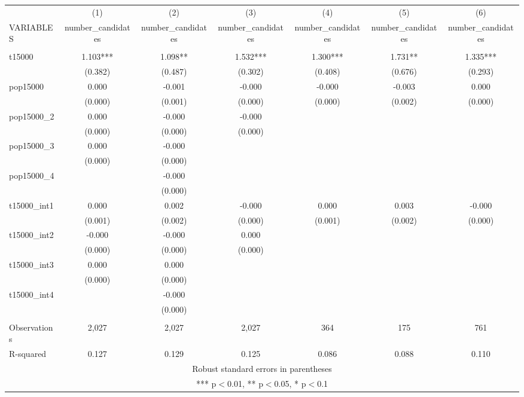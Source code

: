 \documentclass[]{article}
\begin{document}
\begin{tabular}{lcccccc} \hline
 & (1) & (2) & (3) & (4) & (5) & (6) \\
VARIABLES & number\_candidates & number\_candidates & number\_candidates & number\_candidates & number\_candidates & number\_candidates \\ \hline
 &  &  &  &  &  &  \\
t15000 & 1.103*** & 1.098** & 1.532*** & 1.300*** & 1.731** & 1.335*** \\
 & (0.382) & (0.487) & (0.302) & (0.408) & (0.676) & (0.293) \\
pop15000 & 0.000 & -0.001 & -0.000 & -0.000 & -0.003 & 0.000 \\
 & (0.000) & (0.001) & (0.000) & (0.000) & (0.002) & (0.000) \\
pop15000\_2 & 0.000 & -0.000 & -0.000 &  &  &  \\
 & (0.000) & (0.000) & (0.000) &  &  &  \\
pop15000\_3 & 0.000 & -0.000 &  &  &  &  \\
 & (0.000) & (0.000) &  &  &  &  \\
pop15000\_4 &  & -0.000 &  &  &  &  \\
 &  & (0.000) &  &  &  &  \\
t15000\_int1 & 0.000 & 0.002 & -0.000 & 0.000 & 0.003 & -0.000 \\
 & (0.001) & (0.002) & (0.000) & (0.001) & (0.002) & (0.000) \\
t15000\_int2 & -0.000 & -0.000 & 0.000 &  &  &  \\
 & (0.000) & (0.000) & (0.000) &  &  &  \\
t15000\_int3 & 0.000 & 0.000 &  &  &  &  \\
 & (0.000) & (0.000) &  &  &  &  \\
t15000\_int4 &  & -0.000 &  &  &  &  \\
 &  & (0.000) &  &  &  &  \\
 &  &  &  &  &  &  \\
Observations & 2,027 & 2,027 & 2,027 & 364 & 175 & 761 \\
 R-squared & 0.127 & 0.129 & 0.125 & 0.086 & 0.088 & 0.110 \\ \hline
\multicolumn{7}{c}{ Robust standard errors in parentheses} \\
\multicolumn{7}{c}{ *** p$<$0.01, ** p$<$0.05, * p$<$0.1} \\
\end{tabular}
\end{document}
